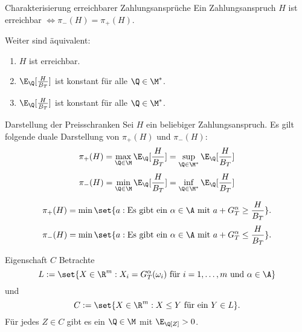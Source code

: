 \begin{karte}{Charakterisierung erreichbarer Zahlungsansprüche}
Ein Zahlungsanspruch \(H\) ist erreichbar \(\Leftrightarrow \pi_-(H) = \pi_+(H)\).

Weiter sind äquivalent: 
\begin{enumerate}
    \item \(H\) ist erreichbar.
    \item \(\E_\Q[\frac{H}{B_T}]\) ist konstant für alle \(\Q\in \M^*\).
    \item \(\E_\Q[\frac{H}{B_T}]\) ist konstant für alle \(\Q\in\M^*\).
\end{enumerate}
\end{karte}

\begin{karte}{Darstellung der Preisschranken}
Sei \(H\) ein beliebiger Zahlungsanspruch. 
Es gilt folgende duale Darstellung von \(\pi_+(H)\) und \(\pi_-(H)\): 
\[ \pi_+(H) = \max_{\Q\in\M} \E_\Q[\frac{H}{B_T}] = \sup_{\Q\in\M^*}\E_\Q[\frac{H}{B_T}] \]
\[ \pi_-(H) = \min_{\Q\in\M} \E_\Q[\frac{H}{B_T}] = \inf_{\Q\in\M^*}\E_\Q[\frac{H}{B_T}] \]

\[ \pi_+(H) = \min\set{ a: \text{Es gibt ein \(\alpha\in \A\) mit } a + G_T^\alpha \geq \frac{H}{B_T} }. \]
\[ \pi_-(H) = \min\set{ a: \text{Es gibt ein \(\alpha\in \A\) mit } a + G_T^\alpha \leq \frac{H}{B_T} }. \]
\end{karte}

\begin{karte}{Eigenschaft \(C\)}
Betrachte 
\[ L :=\set{ X\in\R^m: X_i = G_T^\alpha(\omega_i) \text{ für } i = 1,\ldots, m \text{ und } \alpha\in \A } \]
und 
\[ C := \set{ X \in \R^m: X \leq Y \text{ für ein } Y \in L }. \]
Für jedes \(Z\in C\) gibt es ein \(\Q\in\M\) mit \(\E_\Q[Z] > 0\).
\end{karte}